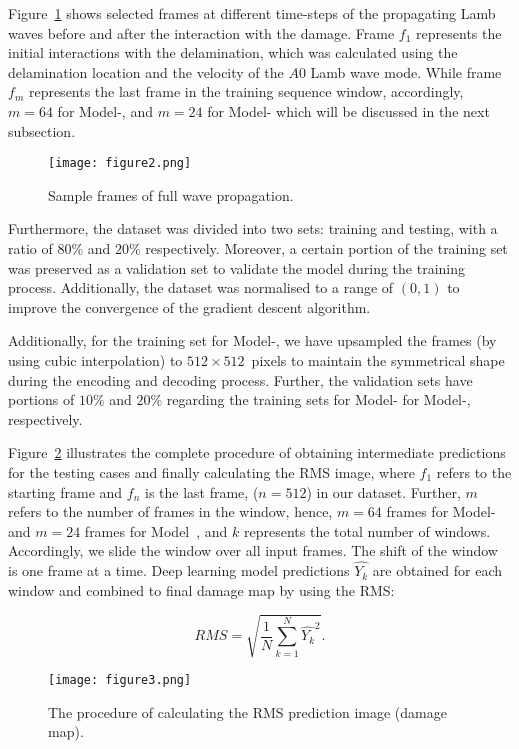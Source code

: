 Figure~\ref{fig:Full_wave} shows selected frames at different time-steps of the propagating Lamb waves before and after the interaction with the damage.
Frame \(f_{1}\) represents the initial interactions with the delamination, which was calculated using the delamination location and the velocity of the \(A0\) Lamb wave mode.
While frame \(f_{m}\) represents the last frame in the training sequence window, accordingly, \(m=64\) for Model-, and \(m=24\) for Model- which will be discussed in the next subsection.
\begin{figure}[!h]
	\centering
	\texttt{[image: figure2.png]}
	\caption{Sample frames of full wave propagation.}
	\label{fig:Full_wave}
\end{figure}

Furthermore, the dataset was divided into two sets: training and testing, with a ratio of \(80\%\) and \(20\% \) respectively.
Moreover, a certain portion of the training set was preserved as a validation set to validate the model during the training process.
Additionally, the dataset was normalised to a range of \((0, 1)\) to improve the convergence of the gradient descent algorithm.

Additionally, for the training set for Model-, we have upsampled the frames (by using cubic interpolation) to \(512\times512\)~pixels to maintain the symmetrical shape during the encoding and decoding process.
Further, the validation sets have portions of \(10\%\) and \(20\%\) regarding the training sets for Model- for Model-, respectively.

Figure~\ref{fig:Diagram_exp_predictions} illustrates the complete procedure of obtaining intermediate predictions for the testing cases and finally calculating the RMS image, where \(f_{1}\) refers to the starting frame and \(f_{n}\) is the last frame, (\(n=512\)) in our dataset.
Further, \(m\) refers to the number of frames in the window, hence, \(m=64\) frames for Model- and \(m=24\) frames for Model~, and \(k\) represents the total number of windows.
Accordingly, we slide the window over all input frames.
The shift of the window is one frame at a time.
Deep learning model predictions \(\hat{Y_k}\) are obtained for each window and combined to final damage map by using the RMS:

\begin{equation}
	RMS = \sqrt{\frac{1}{N}\sum_{k=1}^{N}\hat{Y_k}^2}.	
	\label{RMS}
\end{equation}
\begin{figure}[!h]
	\centering
	\texttt{[image: figure3.png]}
	\caption{The procedure of calculating the RMS prediction image (damage map).}
	\label{fig:Diagram_exp_predictions}
\end{figure}
\newpage